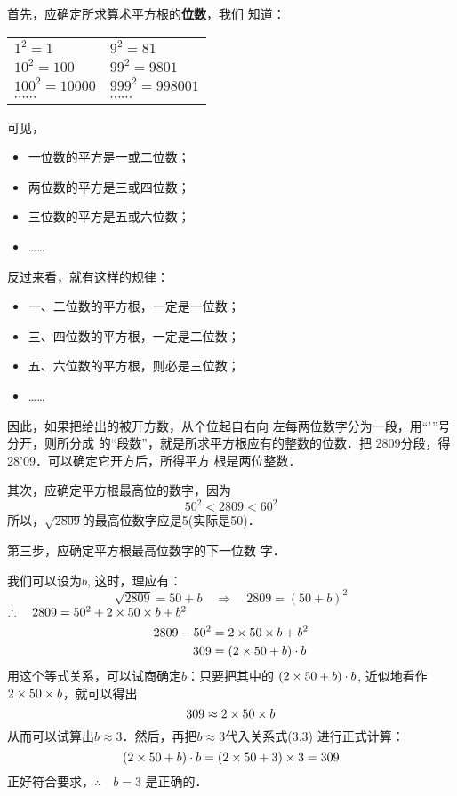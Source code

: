 \begin{solution}
    首先，应确定所求算术平方根的\textbf{位数}，我们
知道：
\begin{center}
    \begin{tabular}{ll}
       $1^2=1$   &  $9^2=81$ \\
       $10^2=100$   &  $99^2=9801$ \\
       $100^2=10000$   &  $999^2=998001$ \\
       $\cdots\cdots$   &  $\cdots\cdots$ \\ 
    \end{tabular}
\end{center}

可见，
\begin{itemize}
    \item 一位数的平方是一或二位数；
    \item 两位数的平方是三或四位数；
    \item 三位数的平方是五或六位数；
    \item ……
\end{itemize}


反过来看，就有这样的规律：
\begin{itemize}
    \item 一、二位数的平方根，一定是一位数；
    \item 三、四位数的平方根，一定是二位数；
    \item 五、六位数的平方根，则必是三位数；
    \item ……
\end{itemize}

因此，如果把给出的被开方数，从个位起自右向
左每两位数字分为一段，用“'”号分开，则所分成
的“段数”，就是所求平方根应有的整数的位数．把
2809分段，得28'09．可以确定它开方后，所得平方
根是两位整数．

其次，应确定平方根最高位的数字，因为
$$50^2<2809<60^2$$
所以，$\sqrt{2809}$的最高位数字应是5(实际是50)．

第三步，应确定平方根最高位数字的下一位数
字．

我们可以设为$b$, 这时，理应有：
\[\sqrt{2809}=50+b  \quad \Rightarrow\quad 2809=(50+b)^2\]
$\therefore\quad 2809=50^2+2\times 50\times b+b^2$
\begin{align}
    2809-50^2&=2\times 50\times b+b^2 \nonumber \\
    309&=(2\times 50+b)\cdot b
\end{align}
用这个等式关系，可以试商确定$b$：只要把其中的
$(2\times50+b)\cdot b$, 近似地看作$2\times50\times b$，就可以得出
\[309\approx 2\times50\times b\]
从而可以试算出$b\approx 3$．然后，再把$b\approx 3$代入关系式(3.3)
进行正式计算：
\[(2\times50+b)\cdot b=(2\times50+3)\times3=309\]
正好符合要求，$\therefore\quad b=3$ 是正确的．


\end{solution}
